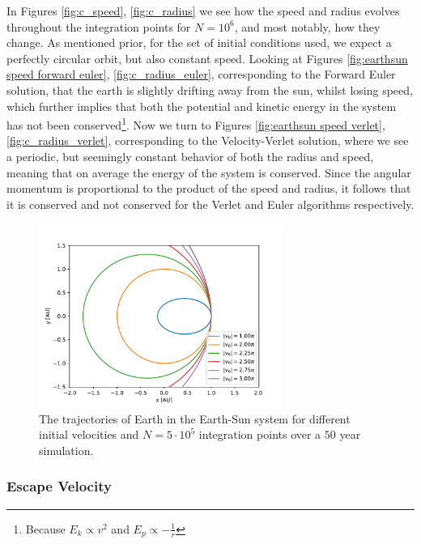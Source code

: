 \documentclass[10pt,showpacs,preprintnumbers,amsmath,amssymb,nofootinbib,aps,prl,twocolumn,groupedaddress,superscriptaddress,showkeys]{revtex4-1}
\begin{document}
    In Figures \ref{fig:c_speed}, \ref{fig:c_radius} we see how the speed and radius evolves throughout the integration points for $N=10^6$, and most notably, how they change. As mentioned prior, for the set of initial conditions used, we expect a perfectly circular orbit, but also constant speed. Looking at Figures \ref{fig:earthsun speed forward euler}, \ref{fig:c_radius_euler}, corresponding to the Forward Euler solution, that the earth is slightly drifting away from the sun, whilst losing speed, which further implies that both the potential and kinetic energy in the system has not been conserved\footnote{Because $E_k \propto v^2$ and $E_p\propto -\frac{1}{r}$}. Now we turn to Figures \ref{fig:earthsun speed verlet}, \ref{fig:c_radius_verlet}, corresponding to the Velocity-Verlet solution, where we see a periodic, but seemingly constant behavior of both the radius and speed, meaning that on average the energy of the system is conserved. Since the angular momentum is proportional to the product of the speed and radius, it follows that it is conserved and not conserved for the Verlet and Euler algorithms respectively.

    \begin{figure}[H]
      \center
      \includegraphics[width=8cm]{figs/ex_d_escape.pdf}
      \caption{The trajectories of Earth in the Earth-Sun system for different initial velocities and $N=5\cdot 10^5$ integration points over a $50$ year simulation.}
      \label{fig: escapevel}
    \end{figure}

    \subsubsection{Escape Velocity}
\end{document}
